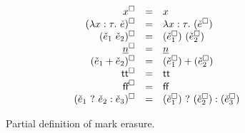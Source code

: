 \newcommand{\erasesToRow}[2]{\erase{#1} & = & #2}
\begin{figure}[htbp]
  \[\begin{array}{rcl}
    \erasesToRow{x}{x} \\
    \erasesToRow{(\ECLam{x}{\TMV}{\ECMV})}{\ELam{x}{\TMV}{(\erase{\ECMV})}} \\
    \erasesToRow{(\ECAp{\ECMV_1}{\ECMV_2})}{\EAp{(\erase{\ECMV_1})}{(\erase{\ECMV_2})}} \\
    \erasesToRow{\ECNumMV}{\ENumMV} \\
    \erasesToRow{(\ECPlus{\ECMV_1}{\ECMV_2})}{\EPlus{(\erase{\ECMV_1})}{(\erase{\ECMV_2})}} \\
    \erasesToRow{\ECTrue}{\ETrue} \\
    \erasesToRow{\ECFalse}{\EFalse} \\
    \erasesToRow{(\ECIf{\ECMV_1}{\ECMV_2}{\ECMV_3})}{\EIf{(\erase{\ECMV_1})}{(\erase{\ECMV_2})}{(\erase{\ECMV_3})}}
  \end{array}\]
  \caption{Partial definition of mark erasure.}
  \label{fig:calculus-mark-erasure-part}
\end{figure}
